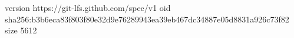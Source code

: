 version https://git-lfs.github.com/spec/v1
oid sha256:b3b6eca83f803f80e32d9e76289943ea39eb467dc34887e05d8831a926c73f82
size 5612
